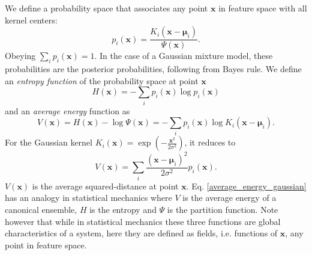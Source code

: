 \documentclass[preprint,12pt]{elsarticle}
\begin{document}
We define a probability space that associates any point ${\mathbf{x}}$ in feature space with all kernel centers:
\begin{equation}\label{probability}
  p_i\left(\mathbf{x}\right)=\frac{K_i\left(\mathbf{x}-\boldsymbol{\mu}_i\right)}{\Psi\left(\mathbf{x}\right)}.
\end{equation}
Obeying $\sum_ip_i\left(\mathbf{x}\right)=1$. In the case of a Gaussian mixture model, these probabilities are the posterior probabilities, following from Bayes rule. We define an \textit{entropy function} of the probability space at point $\mathbf{x}$
\begin{equation}\label{entropy}
  H\left(\mathbf{x}\right)=-\sum_i p_i\left(\mathbf{x}\right)\log p_i\left(\mathbf{x}\right)
\end{equation}
and an \textit{average energy} function as 
\begin{equation}\label{average_energy}
  V\left(\mathbf{x}\right)= H\left(\mathbf{x}\right) - \log\Psi\left(\mathbf{x}\right) = -\sum_i p_i\left(\mathbf{x}\right)\log K_i \left( \mathbf{x}-\boldsymbol{\mu}_i \right).
\end{equation}
For the Gaussian kernel $K_i\left(\mathbf{x}\right)=\exp\left(-\frac{\mathbf{x}^2}{2\sigma^2}\right)$, it reduces to
\begin{equation}\label{average_energy_gaussian}
  V\left(\mathbf{x}\right)= \sum_i \frac{\left(\mathbf{x}-\boldsymbol{\mu}_i\right)^2}{2\sigma^2} p_i\left(\mathbf{x}\right).
\end{equation}
$V\left(\mathbf{x}\right)$ is the average squared-distance at point $\mathbf{x}$. Eq. \ref{average_energy_gaussian} has an analogy in statistical mechanics \cite{jaynes1957} where $V$ is the average energy of a canonical ensemble, $H$ is the entropy and $\Psi$ is the partition function. Note however that while in statistical mechanics these three functions are global characteristics of a system, here they are defined as fields, i.e. functions of $\mathbf{x}$, any point in feature space.
\end{document}
